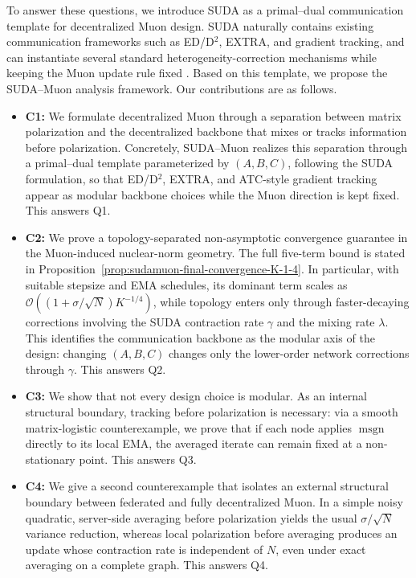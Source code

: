 \documentclass{article}
\newcommand{\sudamuon}{SUDA--Muon}
\begin{document}
To answer these questions, we introduce SUDA as a primal--dual communication template for decentralized Muon design. SUDA naturally contains existing communication frameworks such as ED/D$^2$, EXTRA, and gradient tracking, and can instantiate several standard heterogeneity-correction mechanisms while keeping the Muon update rule fixed \citep{alghunaim2022unified}. Based on this template, we propose the \sudamuon{} analysis framework. Our contributions are as follows.

\begin{itemize}
    \item 
    \textbf{C1:} We formulate decentralized Muon through a separation between matrix polarization and the decentralized backbone that mixes or tracks information before polarization. Concretely, \sudamuon{} realizes this separation through a primal--dual template parameterized by $(A,B,C)$, following the SUDA formulation, so that ED/D$^2$, EXTRA, and ATC-style gradient tracking appear as modular backbone choices while the Muon direction is kept fixed. This answers Q1.
    
    \item 
    \textbf{C2:} We prove a topology-separated non-asymptotic convergence guarantee in the Muon-induced nuclear-norm geometry. The full five-term bound is stated in Proposition~\ref{prop:sudamuon-final-convergence-K-1-4}. In particular, with suitable stepsize and EMA schedules, its dominant term scales as $\mathcal{O}((1+\sigma/\sqrt{N})K^{-1/4})$, while topology enters only through faster-decaying corrections involving the SUDA contraction rate $\gamma$ and the mixing rate $\lambda$. This identifies the communication backbone as the modular axis of the design: changing $(A,B,C)$ changes only the lower-order network corrections through $\gamma$. This answers Q2.
    
    \item 
    \textbf{C3:} We show that not every design choice is modular. As an internal structural boundary, tracking before polarization is necessary: via a smooth matrix-logistic counterexample, we prove that if each node applies $\operatorname{msgn}$ directly to its local EMA, the averaged iterate can remain fixed at a non-stationary point. This answers Q3.
    
    \item 
    \textbf{C4:} We give a second counterexample that isolates an external structural boundary between federated and fully decentralized Muon. In a simple noisy quadratic, server-side averaging before polarization yields the usual $\sigma/\sqrt{N}$ variance reduction, whereas local polarization before averaging produces an update whose contraction rate is independent of $N$, even under exact averaging on a complete graph. This answers Q4.
    

\end{itemize}
\end{document}
